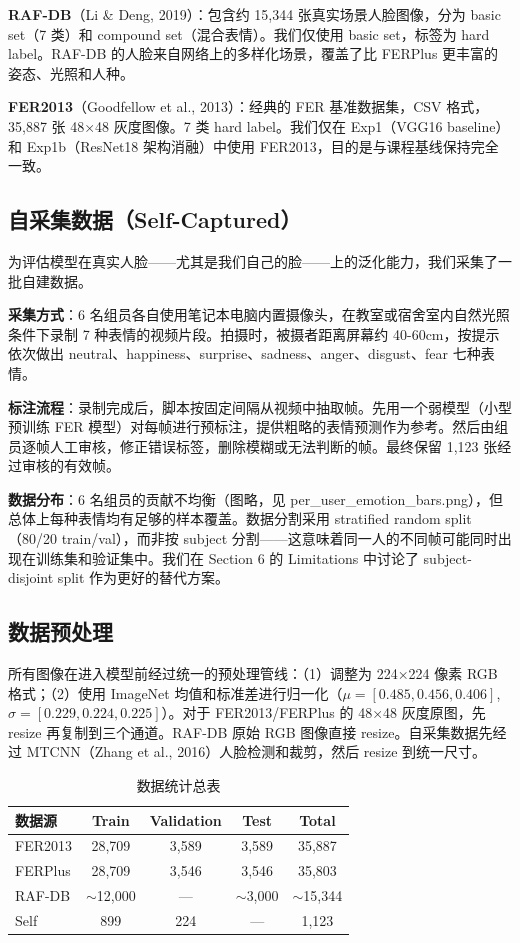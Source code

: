 \documentclass[12pt,a4paper]{article}
\begin{document}
\textbf{RAF-DB}（Li \& Deng, 2019）：包含约 15,344 张真实场景人脸图像，分为 basic set（7 类）和 compound set（混合表情）。我们仅使用 basic set，标签为 hard label。RAF-DB 的人脸来自网络上的多样化场景，覆盖了比 FERPlus 更丰富的姿态、光照和人种。

\textbf{FER2013}（Goodfellow et al., 2013）：经典的 FER 基准数据集，CSV 格式，35,887 张 48×48 灰度图像。7 类 hard label。我们仅在 Exp1（VGG16 baseline）和 Exp1b（ResNet18 架构消融）中使用 FER2013，目的是与课程基线保持完全一致。

\subsection{自采集数据（Self-Captured）}

为评估模型在真实人脸——尤其是我们自己的脸——上的泛化能力，我们采集了一批自建数据。

\textbf{采集方式}：6 名组员各自使用笔记本电脑内置摄像头，在教室或宿舍室内自然光照条件下录制 7 种表情的视频片段。拍摄时，被摄者距离屏幕约 40-60cm，按提示依次做出 neutral、happiness、surprise、sadness、anger、disgust、fear 七种表情。

\textbf{标注流程}：录制完成后，脚本按固定间隔从视频中抽取帧。先用一个弱模型（小型预训练 FER 模型）对每帧进行预标注，提供粗略的表情预测作为参考。然后由组员逐帧人工审核，修正错误标签，删除模糊或无法判断的帧。最终保留 1,123 张经过审核的有效帧。

\textbf{数据分布}：6 名组员的贡献不均衡（图略，见 per\_user\_emotion\_bars.png），但总体上每种表情均有足够的样本覆盖。数据分割采用 stratified random split（80/20 train/val），而非按 subject 分割——这意味着同一人的不同帧可能同时出现在训练集和验证集中。我们在 Section 6 的 Limitations 中讨论了 subject-disjoint split 作为更好的替代方案。

\subsection{数据预处理}

所有图像在进入模型前经过统一的预处理管线：（1）调整为 224×224 像素 RGB 格式；（2）使用 ImageNet 均值和标准差进行归一化（$\mu=[0.485, 0.456, 0.406]$, $\sigma=[0.229, 0.224, 0.225]$）。对于 FER2013/FERPlus 的 48×48 灰度原图，先 resize 再复制到三个通道。RAF-DB 原始 RGB 图像直接 resize。自采集数据先经过 MTCNN（Zhang et al., 2016）人脸检测和裁剪，然后 resize 到统一尺寸。

\begin{table}[H]
\centering
\caption{数据统计总表}
\begin{tabular}{lcccc}
\toprule
数据源 & Train & Validation & Test & Total \\
\midrule
FER2013 & 28,709 & 3,589 & 3,589 & 35,887 \\
FERPlus & 28,709 & 3,546 & 3,546 & 35,803 \\
RAF-DB  & $\sim$12,000 & — & $\sim$3,000 & $\sim$15,344 \\
Self    & 899 & 224 & — & 1,123 \\
\bottomrule
\end{tabular}
\end{table}
\end{document}
